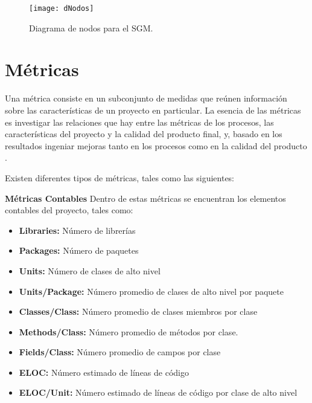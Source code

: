 \begin{figure}[H]
	\centering
	\texttt{[image: dNodos]}
	\centering
	\caption{Diagrama de nodos para el SGM.}
	\label{fig:dNodos}
\end{figure}
\newpage


\section{Métricas}

Una métrica consiste en un subconjunto de medidas que reúnen información sobre las características de un proyecto en particular. La esencia de las métricas es investigar las relaciones que hay entre las métricas de los procesos, las características del proyecto y la calidad del producto final, y, basado en los resultados ingeniar mejoras tanto en los procesos como en la calidad del producto \cite{Stehen_2003}.  

Existen diferentes tipos de métricas, tales como las siguientes:

\textbf{Métricas Contables} Dentro de estas métricas se encuentran los elementos contables del proyecto, tales como:
\begin{itemize}[itemsep=1mm,topsep=0pt,leftmargin=0.6in]
	\item\textbf{Libraries:} Número de librerías
	\item\textbf{Packages:} Número de paquetes
	\item\textbf{Units:} Número de clases de alto nivel
	\item\textbf{Units/Package:} Número promedio de clases de alto nivel por paquete
	\item\textbf{Classes/Class:} Número promedio de clases miembros por clase
	\item\textbf{Methods/Class:} Número promedio de métodos por clase.
	\item\textbf{Fields/Class:} Número promedio de campos por clase
	\item\textbf{ELOC:} Número estimado de líneas de código
	\item\textbf{ELOC/Unit:}  Número estimado de líneas de código por clase de alto nivel
\end{itemize}


